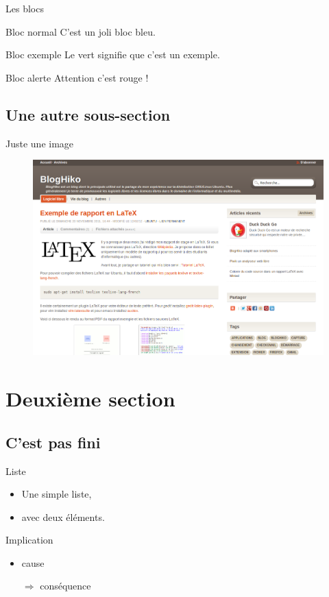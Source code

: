 \documentclass[utf8,compress]{beamer}
\begin{document}
\begin{frame}[containsverbatim]{Les blocs}
\begin{block}{Bloc normal}
     C'est un joli bloc bleu.
\end{block}
\begin{exampleblock}{Bloc exemple}
     Le vert signifie que c'est un exemple.
\end{exampleblock}
\begin{alertblock}{Bloc alerte}
     Attention c'est rouge !
\end{alertblock}
\end{frame}

\subsection{Une autre sous-section}

\begin{frame}{Juste une image}
\begin{figure}[h]
    \center
    \includegraphics[width=\textwidth]{bloghiko.png}
\end{figure}
\end{frame}


\section{Deuxième section}

\subsection{C'est pas fini}

\begin{frame}{Liste}
\begin{itemize}
    \item Une simple liste,
    \item avec deux éléments.
\end{itemize}
\begin{block}{Implication}
    \begin{itemize}
    \item cause
    \item[$\Rightarrow$] conséquence
    \end{itemize}
\end{block}
\end{frame}
\end{document}
